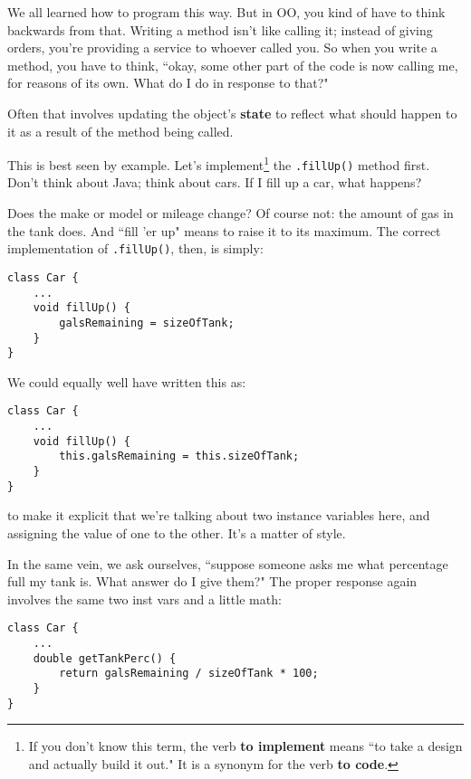We all learned how to program this way. But in OO, you kind of have to think
backwards from that. Writing a method isn't like calling it; instead of giving
orders, you're providing a service to whoever called you. So when you write a
method, you have to think, ``okay, some other part of the code is now calling
me, for reasons of its own. What do I do in response to that?"

Often that involves updating the object's \textbf{state} to reflect what
should happen to it as a result of the method being called.

This is best seen by example. Let's implement\footnote{If you don't know this
term, the verb \textbf{to implement} means ``to take a design and actually
build it out." It is a synonym for the verb \textbf{to code}.} the
\texttt{.fillUp()} method first. Don't think about Java; think about cars. If
I fill up a car, what happens?

Does the make or model or mileage change? Of course not: the amount of gas in
the tank does. And ``fill 'er up" means to raise it to its maximum. The
correct implementation of \texttt{.fillUp()}, then, is simply:

\begin{Verbatim}[samepage=true,fontsize=\scriptsize,frame=single]
class Car {
    ...
    void fillUp() {
        galsRemaining = sizeOfTank;
    }
}
\end{Verbatim}

We could equally well have written this as:

\begin{Verbatim}[samepage=true,fontsize=\scriptsize,frame=single]
class Car {
    ...
    void fillUp() {
        this.galsRemaining = this.sizeOfTank;
    }
}
\end{Verbatim}

to make it explicit that we're talking about two instance variables here, and
assigning the value of one to the other. It's a matter of style.

In the same vein, we ask ourselves, ``suppose someone asks me what percentage
full my tank is. What answer do I give them?" The proper response again
involves the same two inst vars and a little math:

\begin{Verbatim}[samepage=true,fontsize=\scriptsize,frame=single]
class Car {
    ...
    double getTankPerc() {
        return galsRemaining / sizeOfTank * 100;
    }
}
\end{Verbatim}

